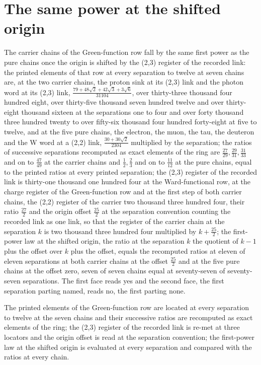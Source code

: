 \section{The same power at the shifted origin}\label{mod:IV-3-D543926-foso-t1}
\begin{chtheorem}\label{box:IV-3-D543926-foso-t1:1}
The carrier chains of the Green-function row fall by the same first power as the pure chains once the origin is shifted by the (2,3) register of the recorded link: the printed elements of that row at every separation to twelve at seven chains are, at the two carrier chains, the proton sink at its (2,3) link and the photon word at its (2,3) link, $\tfrac{79 + 48\sqrt{2} + 42\sqrt{3} + 3\sqrt{6}}{31104}$, over thirty-three thousand four hundred eight, over thirty-five thousand seven hundred twelve and over thirty-eight thousand sixteen at the separations one to four and over forty thousand three hundred twenty to over fifty-six thousand four hundred forty-eight at five to twelve, and at the five pure chains, the electron, the muon, the tau, the deuteron and the W word at a (2,2) link, $\tfrac{30 + 30\sqrt{2}}{2304}$ multiplied by the separation; the ratios of successive separations recomputed as exact elements of the ring are $\tfrac{27}{29}, \tfrac{29}{31}, \tfrac{31}{33}$ and on to $\tfrac{47}{49}$ at the carrier chains and $\tfrac{1}{2}, \tfrac{2}{3}$ and on to $\tfrac{11}{12}$ at the pure chains, equal to the printed ratios at every printed separation; the (2,3) register of the recorded link is thirty-one thousand one hundred four at the Ward-functional row, at the charge register of the Green-function row and at the first step of both carrier chains, the (2,2) register of the carrier two thousand three hundred four, their ratio $\tfrac{27}{2}$ and the origin offset $\tfrac{25}{2}$ at the separation convention counting the recorded link as one link, so that the register of the carrier chain at the separation $k$ is two thousand three hundred four multiplied by $k + \tfrac{25}{2}$; the first-power law at the shifted origin, the ratio at the separation $k$ the quotient of $k - 1$ plus the offset over $k$ plus the offset, equals the recomputed ratios at eleven of eleven separations at both carrier chains at the offset $\tfrac{25}{2}$ and at the five pure chains at the offset zero, seven of seven chains equal at seventy-seven of seventy-seven separations. The first face reads yes and the second face, the first separation parting named, reads no, the first parting none.
\end{chtheorem}
The printed elements of the Green-function row are located at every separation to twelve at the seven chains and their successive ratios are recomputed as exact elements of the ring; the (2,3) register of the recorded link is re-met at three locators and the origin offset is read at the separation convention; the first-power law at the shifted origin is evaluated at every separation and compared with the ratios at every chain.

